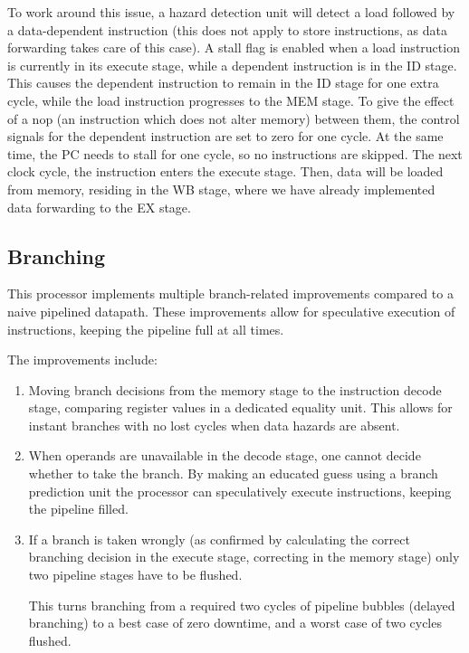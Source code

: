 To work around this issue, a hazard detection unit will detect a load followed by a data-dependent instruction (this does not apply to store instructions, as data forwarding takes care of this case).
A stall flag is enabled when a load instruction is currently in its execute stage, while a dependent instruction is in the ID stage.
This causes the dependent instruction to remain in the ID stage for one extra cycle, while the load instruction progresses to the MEM stage.
To give the effect of a nop (an instruction which does not alter memory) between them, the control signals for the dependent instruction are set to zero for one cycle.
At the same time, the PC needs to stall for one cycle, so no instructions are skipped.
The next clock cycle, the instruction enters the execute stage.
Then, data will be loaded from memory, residing in the WB stage, where we have already implemented data forwarding to the EX stage.

\subsection{Branching}

This processor implements multiple branch-related improvements compared to a naive pipelined datapath.
These improvements allow for speculative execution of instructions, keeping the pipeline full at all times.

The improvements include:
\begin{enumerate}
  \item
    Moving branch decisions from the memory stage to the instruction decode stage, comparing register values in a dedicated equality unit.
    This allows for instant branches with no lost cycles when data hazards are absent.
  \item
    When operands are unavailable in the decode stage, one cannot decide whether to take the branch.
    By making an educated guess using a branch prediction unit the processor can speculatively execute instructions, keeping the pipeline filled.
  \item
    If a branch is taken wrongly (as confirmed by calculating the correct branching decision in the execute stage, correcting in the memory stage) only two pipeline stages have to be flushed.

    This turns branching from a required two cycles of pipeline bubbles (delayed branching) to a best case of zero downtime, and a worst case of two cycles flushed.
\end{enumerate}

